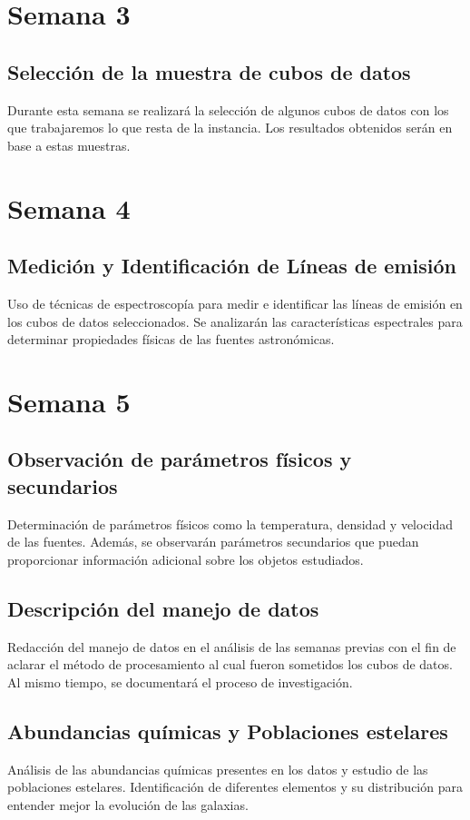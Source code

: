 \documentclass[12pt]{article}
\begin{document}
\section*{Semana 3}
\subsection*{Selección de la muestra de cubos de datos}
Durante esta semana se realizará la selección de algunos cubos de datos con los que trabajaremos lo que resta de la instancia. Los resultados obtenidos serán en base a estas muestras.

\section*{Semana 4}
\subsection*{Medición y Identificación de Líneas de emisión}
Uso de técnicas de espectroscopía para medir e identificar las líneas de emisión en los cubos de datos seleccionados. Se analizarán las características espectrales para determinar propiedades físicas de las fuentes astronómicas.

\section*{Semana 5}
\subsection*{Observación de parámetros físicos y secundarios}
Determinación de parámetros físicos como la temperatura, densidad y velocidad de las fuentes. Además, se observarán parámetros secundarios que puedan proporcionar información adicional sobre los objetos estudiados.

\subsection*{Descripción del manejo de datos}
Redacción del manejo de datos en el análisis de las semanas previas con el fin de aclarar el método de procesamiento al cual fueron sometidos los cubos de datos. Al mismo tiempo, se documentará el proceso de investigación.

\subsection*{Abundancias químicas y Poblaciones estelares}
Análisis de las abundancias químicas presentes en los datos y estudio de las poblaciones estelares. Identificación de diferentes elementos y su distribución para entender mejor la evolución de las galaxias.
\end{document}
